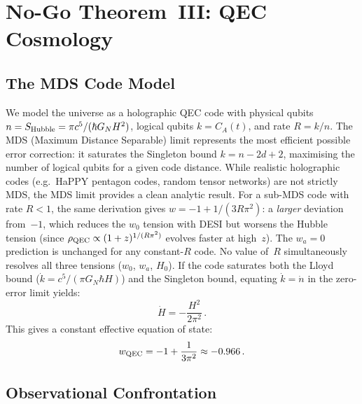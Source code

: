 \documentclass[12pt,a4paper]{article}
\theoremstyle{remark}
\begin{document}
\section{No-Go Theorem~III: QEC Cosmology}
\label{sec:qec_nogo}

\subsection{The MDS Code Model}

We model the universe as a holographic QEC code with physical qubits $n = S_{\rm Hubble} = \pi c^5/(\hbar G_N H^2)$, logical qubits $k = C_A(t)$, and rate $R = k/n$.
The MDS (Maximum Distance Separable) limit represents the most efficient possible error correction: it saturates the Singleton bound $k = n - 2d + 2$, maximising the number of logical qubits for a given code distance.
While realistic holographic codes (e.g.\ HaPPY pentagon codes, random tensor networks) are not strictly MDS, the MDS limit provides a clean analytic result.
For a sub-MDS code with rate $R < 1$, the same derivation gives $w = -1 + 1/(3R\pi^2)$: a \emph{larger} deviation from~$-1$, which reduces the $w_0$ tension with DESI but worsens the Hubble tension (since $\rho_{\rm QEC}\propto (1+z)^{1/(R\pi^2)}$ evolves faster at high~$z$).
The $w_a = 0$ prediction is unchanged for any constant-$R$ code.
No value of~$R$ simultaneously resolves all three tensions ($w_0$, $w_a$, $H_0$).
If the code saturates both the Lloyd bound ($\dot k = c^5/(\pi G_N\hbar H)$) and the Singleton bound, equating $\dot k = \dot n$ in the zero-error limit yields:
\begin{equation}\label{eq:Hdot_QEC}
\dot H = -\frac{H^2}{2\pi^2}\,.
\end{equation}
This gives a constant effective equation of state:
\begin{equation}\label{eq:wQEC}
w_{\rm QEC} = -1 + \frac{1}{3\pi^2} \approx -0.966\,.
\end{equation}

\subsection{Observational Confrontation}
\end{document}
